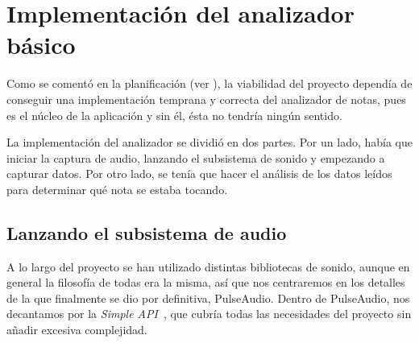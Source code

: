 \section{Implementación del analizador básico}
\label{sec:implementacion_analizador}
Como se comentó en la planificación (ver \textit{}), la
viabilidad del proyecto dependía de conseguir una implementación temprana y
correcta del analizador de notas, pues es el núcleo de la aplicación y sin él,
ésta no tendría ningún sentido.

La implementación del analizador se dividió en dos partes. Por un lado, había
que iniciar la captura de audio, lanzando el subsistema de sonido y empezando a
capturar datos. Por otro lado, se tenía que hacer el análisis de los datos
leídos para determinar qué nota se estaba tocando.

\subsection{Lanzando el subsistema de audio}
A lo largo del proyecto se han utilizado distintas bibliotecas de sonido, aunque
en general la filosofía de todas era la misma, así que nos centraremos en los
detalles de la que finalmente se dio por definitiva, PulseAudio. Dentro de
PulseAudio, nos decantamos por la \textit{Simple API}~\cite{pulseaudiosimple},
que cubría todas las necesidades del proyecto sin añadir excesiva complejidad.

